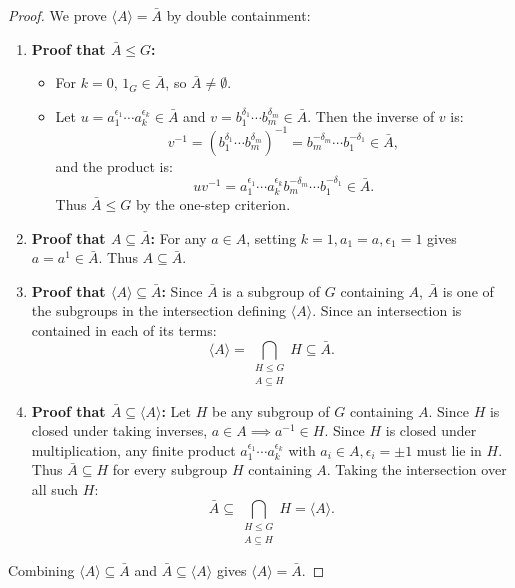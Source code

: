 \begin{proof}
We prove $\langle A \rangle = \bar{A}$ by double containment:
\begin{enumerate}[label=\arabic*., leftmargin=*]
    \item \textbf{Proof that $\bar{A} \le G$:}
    \begin{itemize}[leftmargin=1.5em, itemsep=4pt]
        \item For $k = 0$, $1_G \in \bar{A}$, so $\bar{A} \ne \emptyset$.
        \item Let $u = a_1^{\epsilon_1} \cdots a_k^{\epsilon_k} \in \bar{A}$ and $v = b_1^{\delta_1} \cdots b_m^{\delta_m} \in \bar{A}$.
        Then the inverse of $v$ is:
        \begin{equation*}
        v^{-1} = (b_1^{\delta_1} \cdots b_m^{\delta_m})^{-1} = b_m^{-\delta_m} \cdots b_1^{-\delta_1} \in \bar{A},
        \end{equation*}
        and the product is:
        \begin{equation*}
        uv^{-1} = a_1^{\epsilon_1} \cdots a_k^{\epsilon_k} b_m^{-\delta_m} \cdots b_1^{-\delta_1} \in \bar{A}.
        \end{equation*}
        Thus $\bar{A} \le G$ by the one-step criterion.
    \end{itemize}

    \item \textbf{Proof that $A \subseteq \bar{A}$:}
    For any $a \in A$, setting $k = 1, a_1 = a, \epsilon_1 = 1$ gives $a = a^1 \in \bar{A}$. Thus $A \subseteq \bar{A}$.

    \item \textbf{Proof that $\langle A \rangle \subseteq \bar{A}$:}
    Since $\bar{A}$ is a subgroup of $G$ containing $A$, $\bar{A}$ is one of the subgroups in the intersection defining $\langle A \rangle$.
    Since an intersection is contained in each of its terms:
    \begin{equation*}
    \langle A \rangle = \bigcap_{\substack{H \le G \\ A \subseteq H}} H \subseteq \bar{A}.
    \end{equation*}

    \item \textbf{Proof that $\bar{A} \subseteq \langle A \rangle$:}
    Let $H$ be any subgroup of $G$ containing $A$.
    Since $H$ is closed under taking inverses, $a \in A \implies a^{-1} \in H$.
    Since $H$ is closed under multiplication, any finite product $a_1^{\epsilon_1} \cdots a_k^{\epsilon_k}$ with $a_i \in A, \epsilon_i = \pm 1$ must lie in $H$.
    Thus $\bar{A} \subseteq H$ for every subgroup $H$ containing $A$.
    Taking the intersection over all such $H$:
    \begin{equation*}
    \bar{A} \subseteq \bigcap_{\substack{H \le G \\ A \subseteq H}} H = \langle A \rangle.
    \end{equation*}
\end{enumerate}
Combining $\langle A \rangle \subseteq \bar{A}$ and $\bar{A} \subseteq \langle A \rangle$ gives $\langle A \rangle = \bar{A}$.
\end{proof}

